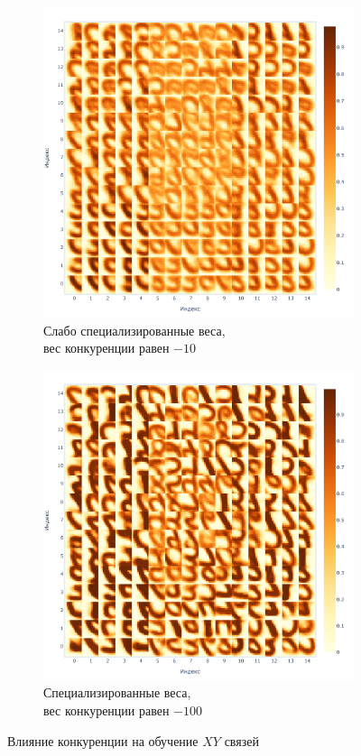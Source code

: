 \documentclass[a4paper]{article}
\begin{document}
\begin{figure}
\centering
\begin{subfigure}{0.2\textwidth}
    \includegraphics[width=\textwidth,keepaspectratio=true]{weights_XY_bad_ru.pdf}
    \caption{Слабо специализированные веса,\\ вес конкуренции равен $-10$}
\end{subfigure}
\begin{subfigure}{0.2\textwidth}
    \includegraphics[width=\textwidth,keepaspectratio=true]{weights_XY_good_ru.pdf}
    \caption{Специализированные веса,\\ вес конкуренции равен $-100$}
\end{subfigure}
\caption{Влияние конкуренции на обучение $XY$ связей}
\end{figure}
\end{document}

